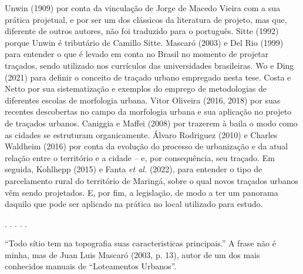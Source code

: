 \documentclass[12pt, a4paper]{book} %
\begin{document}
        Unwin (1909) por conta da vinculação de Jorge de Macedo Vieira com a sua prática projetual, e por ser um dos clássicos da literatura de projeto, mas que, diferente de outros autores, não foi traduzido para o português. Sitte (1992) porque Unwin é tributário de Camillo Sitte. Mascaró (2003) e Del Rio (1999) para entender o que é levado em conta no Brasil no momento de projetar traçados, sendo utilizado nos currículos das universidades brasileiras. Wo e Ding (2021) para definir o conceito de traçado urbano empregado nesta tese. Costa e Netto por sua sistematização e exemplos do emprego de metodologias de diferentes escolas de morfologia urbana. Vitor Oliveira (2016, 2018) por suas recentes descobertas no campo da morfologia urbana e sua aplicação no projeto de traçados urbanos. Caniggia e Maffei (2008) por trazerem à baila o modo como as cidades se estruturam organicamente. Álvaro Rodriguez (2010) e Charles Waldheim (2016) por conta da evolução do processo de urbanização e da atual relação entre o território e a cidade – e, por consequência, seu traçado. Em seguida, Kohlhepp (2015) e Fanta \textit{et al.} (2022), para entender o tipo de parcelamento rural do território de Maringá, sobre o qual novos traçados urbanos vêm sendo projetados. E, por fim, a legislação, de modo a ter um panorama daquilo que pode ser aplicado na prática no local utilizado para estudo.
   

        \begin{center}
        . . . . .
        \end{center} 

            ``Todo sítio tem na topografia suas caracteristicas principais.'' A frase não é minha, mas de Juan Luis Mascaró (2003, p. 13), autor de um dos mais conhecidos manuais de ``Loteamentos Urbanos''.
\end{document}
